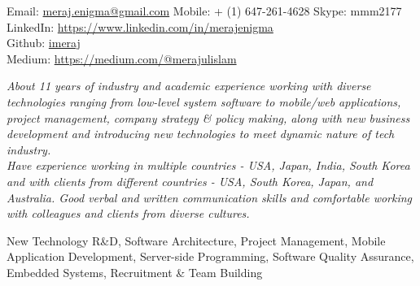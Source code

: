 \documentclass[10pt,a4paper]{article} %
\begin{document}


\noindent Email: \href{mailto:meraj.enigma@gmail.com}{meraj.enigma@gmail.com}\bull
\textsmaller Mobile: {+} (1) 647-261-4628 \bull Skype: mmm2177\\
LinkedIn: \href{https://www.linkedin.com/in/merajenigma}{https://www.linkedin.com/in/merajenigma}\\
Github: \href{https://github.com/imeraj}{imeraj} \\
Medium: \href{https://medium.com/@merajulislam} {https://medium.com/@merajulislam}


\spacedhrule{0.9em}{-0.4em} %



\vspace{-1.3em} %

\begin{multicols}{2}  %
\noindent \textit{About 11 years of industry and academic experience working with diverse technologies ranging from low-level system software to mobile/web applications, project management, company strategy \& policy making, along with new business development and introducing new technologies to meet dynamic nature of tech industry.\\
Have experience working in multiple countries - USA, Japan, India, South Korea and with clients from different countries - USA, South Korea, Japan, and Australia. Good verbal and written communication skills and comfortable working with colleagues and clients from diverse cultures.}
\end{multicols}

 New Technology R\&D, Software Architecture, Project Management, Mobile Application Development, Server-side Programming, Software Quality Assurance, Embedded Systems, Recruitment \& Team Building\\
\end{document}
